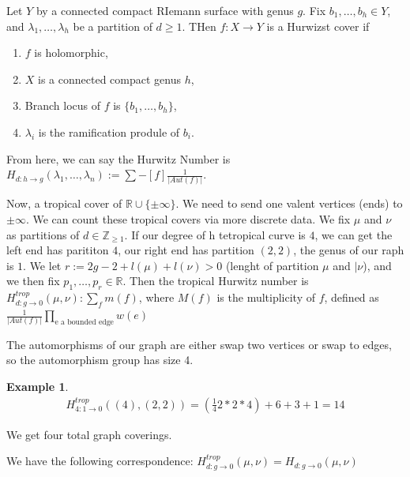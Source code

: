 \documentclass[12pt]{memoir}
\theoremstyle{definition}
\newtheorem{protoexample}{Example}[section]
\newenvironment{ex}
   {\begin{protoexample}}
   {\end{protoexample}}
\def\ZZ{{\mathbb Z}}
\def\RR{{\mathbb R}}
\begin{document}
Let $Y$ by a connected compact RIemann surface with genus $g$. Fix $b_1, \dots, b_h \in Y$, and $\lambda_1, \dots, \lambda_h$ be a partition of $d \geq 1$. THen $f:X \rightarrow Y$ is a Hurwizst cover if 

\begin{enumerate}
    \item $f$ is holomorphic, 
    \item $X$ is a connected compact genus $h$,
    \item Branch locus of $f$ is $\{b_1, \dots, b_h\}$,
    \item $\lambda_i$ is the ramification produle of $b_i$.
\end{enumerate}



From here, we can say the Hurwitz Number is $H_{d:h \rightarrow g}(\lambda_1, \dots, \lambda_n):= \sum\limits-{[f]} \frac{1}{|Aut(f)|}$.



Now, a tropical cover of $\RR \cup \{\pm\infty\}$. We need to send one valent vertices (ends) to $\pm \infty$. We can count these tropical covers via more discrete data. We fix $\mu$ and $\nu$ as partitions of $d \in \ZZ_{\geq 1}$. If our degree of h tetropical curve is $4$, we can get the left end has parititon $4$, our right end has partition $(2,2)$, the genus of our raph is $1$. We let $r:=2g-2+l(\mu) + l(\nu) >0$ (lenght of partition $\mu$ and $|\nu$), and we then fix $p_1, \dots, p_r \in \RR$. Then the tropical Hurwitz number is $H^{trop}_{d: g \rightarrow 0}(\mu,\nu): \sum\limits_{f} m(f)$, where $M(f)$ is the multiplicity of $f$, defined as $\frac{1}{|Aut(f)|}\prod_{\text{e a bounded edge}}w(e)$


The automorphisms of our graph are either swap two vertices or swap to edges, so the automorphism group has size 4.

\begin{ex}
    \begin{align*}
        H^{trop}_{4:1\rightarrow 0} ((4),(2,2))=\left( \frac{1}{4} 2*2*4\right) +6+3+1 =14
    \end{align*}
    
\end{ex}

We get four total graph coverings.



We have the following correspondence: $H^{trop}_{d: g \rightarrow 0}(\mu,\nu)=H_{d: g \rightarrow 0}(\mu,\nu)$








\ifx\nextra\undefined
\printindex
\else\fi
\nocite{*}


\end{document}
